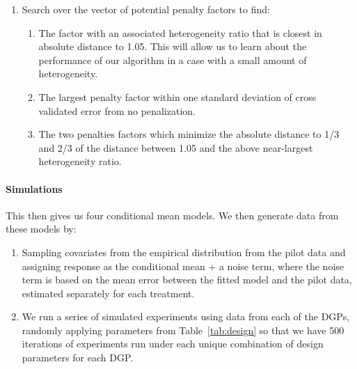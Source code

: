\documentclass[letterpaper, 12pt, parskip=full,]{scrartcl}
\begin{document}
\begin{enumerate}
\item Search over the vector of potential penalty factors to find:
\begin{enumerate}
\item The factor with an associated heterogeneity ratio that is closest in absolute distance to 1.05. This will allow us to learn about the performance of our algorithm in a case with a small amount of heterogeneity. 
\item The largest penalty factor within one standard deviation of cross validated error from no penalization. 
\item The two penalties factors which minimize the absolute distance to 1/3 and 2/3 of the distance between 1.05 and the above near-largest heterogeneity ratio. 
\end{enumerate}
\end{enumerate}

\paragraph{Simulations}
This then gives us four conditional mean models. We then generate data from these models by:
\begin{enumerate}
\item  Sampling covariates from the empirical distribution from the pilot data and assigning response as the conditional mean + a noise term, where the noise term is based on the mean error between the fitted model and the pilot data, estimated separately for each treatment. 
\item We run a series of simulated experiments using data from each of the DGPs, randomly applying parameters from Table~\ref{tab:design} so that we have 500 iterations of experiments run under each unique combination of design parameters for each DGP. 
\end{enumerate}
\end{document}

